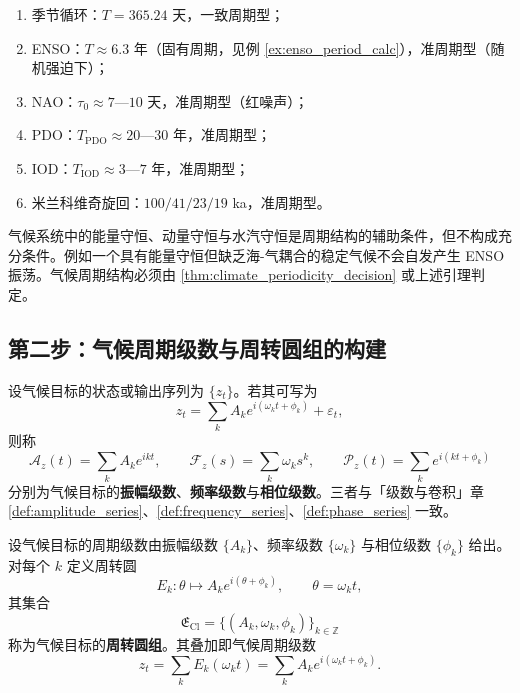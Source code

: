 \begin{example}[气候周期判定实例]\label{ex:climate_periodic_examples}
\begin{enumerate}[label=(\roman*)]
    \item 季节循环：$T=365.24$ 天，一致周期型；
    \item ENSO：$T\approx6.3$ 年（固有周期，见例 \ref{ex:enso_period_calc}），准周期型（随机强迫下）；
    \item NAO：$\tau_0\approx7$—$10$ 天，准周期型（红噪声）；
    \item PDO：$T_{\text{PDO}}\approx20$—$30$ 年，准周期型；
    \item IOD：$T_{\text{IOD}}\approx3$—$7$ 年，准周期型；
    \item 米兰科维奇旋回：$100/41/23/19$ ka，准周期型。
\end{enumerate}
\end{example}

\begin{remark}[守恒量不保证周期]\label{rem:climate_invariant_not_period}
气候系统中的能量守恒、动量守恒与水汽守恒是周期结构的辅助条件，但不构成充分条件。例如一个具有能量守恒但缺乏海-气耦合的稳定气候不会自发产生 ENSO 振荡。气候周期结构必须由 \cref{thm:climate_periodicity_decision} 或上述引理判定。
\end{remark}

\subsection{第二步：气候周期级数与周转圆组的构建}

\begin{definition}\label{def:climate_series}
设气候目标的状态或输出序列为 $\{z_t\}$。若其可写为
\[
z_t=\sum_k A_k e^{i(\omega_k t+\phi_k)}+\varepsilon_t,
\]
则称
\[
\mathcal A_z(t)=\sum_k A_k e^{ikt},\qquad
\mathcal F_z(s)=\sum_k \omega_k s^k,\qquad
\mathcal P_z(t)=\sum_k e^{i(kt+\phi_k)}
\]
分别为气候目标的\textbf{振幅级数}、\textbf{频率级数}与\textbf{相位级数}。三者与「级数与卷积」章 \cref{def:amplitude_series}、\cref{def:frequency_series}、\cref{def:phase_series} 一致。
\end{definition}

\begin{definition}[气候周转圆组]\label{def:climate_epicycle_group}
设气候目标的周期级数由振幅级数 $\{A_k\}$、频率级数 $\{\omega_k\}$ 与相位级数 $\{\phi_k\}$ 给出。对每个 $k$ 定义周转圆
\[
E_k:\theta\mapsto A_k e^{i(\theta+\phi_k)},\qquad \theta=\omega_k t,
\]
其集合
\[
\mathfrak E_{\mathrm{Cl}}=\{(A_k,\omega_k,\phi_k)\}_{k\in\mathbb Z}
\]
称为气候目标的\textbf{周转圆组}。其叠加即气候周期级数
\[
z_t=\sum_k E_k(\omega_k t)=\sum_k A_k e^{i(\omega_k t+\phi_k)}.
\]
\end{definition}

